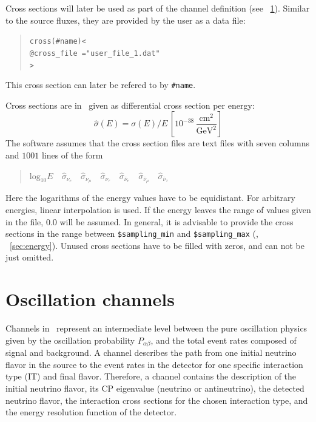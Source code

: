 Cross sections will later be used as part of the 
channel definition (see \Sec~\ref{sec:channel}). Similar to the source 
fluxes, they are provided by the user as a data file:
\begin{quote}
{\tt cross(\#name)<}\\
{\tt \tb @cross\_file ="user\_file\_1.dat"}\\
{\tt >}
\end{quote}  
This cross section can later be refered to by {\tt \#name}.

Cross sections are in \GLOBES\ given as differential cross section per energy:
\begin{equation}
\hat\sigma(E)=\sigma(E)/E\,\left[ 10^{-38}\,
\frac{\mathrm{cm}^2}{\mathrm{GeV}^2} \right]
\end{equation}
The software assumes that the cross section files are text files with 
seven columns and $1001$ lines of the form
\begin{quotation}
$\mathrm{log}_{10} E\quad
\hat\sigma_{\nu_e}\quad
\hat\sigma_{\nu_\mu}\quad
\hat\sigma_{\nu_\tau}\quad
\hat\sigma_{\bar\nu_e}\quad
\hat\sigma_{\bar\nu_\mu}\quad
\hat\sigma_{\bar\nu_\tau}$
\end{quotation}
Here the logarithms of the energy values have to be equidistant. For 
arbitrary energies, linear interpolation is used. If the energy leaves the
range of values given in the file, $0.0$ will be assumed. In general, it is advisable to provide the cross sections in the range between {\tt \$sampling\_min} and {\tt \$sampling\_max} (\cf, \Sec~\ref{sec:energy}).
Unused cross sections have to be filled with zeros, and can not
 be just omitted.

\section{Oscillation channels}
\label{sec:channel}

Channels in \GLOBES\ represent an intermediate level 
between the pure oscillation physics given by the oscillation probability
$P_{\alpha\beta}$, and the total event rates composed of signal and 
background. A channel describes the path from one
initial neutrino flavor in the source to the event rates in the detector for one specific interaction type (IT) and final flavor.  
Therefore, a channel contains the description of the 
initial neutrino flavor, its CP eigenvalue (neutrino or antineutrino), 
the detected neutrino flavor, the interaction cross sections for the chosen interaction type, and the energy resolution function of the detector.

